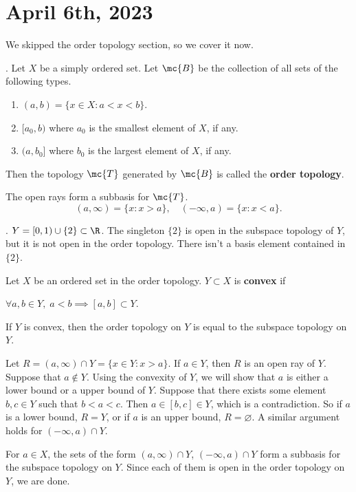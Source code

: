 \section*{April 6th, 2023}

We skipped the order topology section, so we cover it now.

.  Let \(X\) be a simply ordered set. Let \(\mc{B}\) be the collection of all sets of the following types.
\begin{enumerate}
    \item \((a, b) = \{x \in X : a < x < b\}\).
    \item \([a_0, b)\) where \(a_0\) is the smallest element of \(X\), if any.
    \item \((a, b_0]\) where \(b_0\) is the largest element of \(X\), if any.
\end{enumerate}
Then the topology \(\mc{T}\) generated by \(\mc{B}\) is called the \textbf{order topology}.

\rmk The open rays form a subbasis for \(\mc{T}\).
\[
    (a, \infty) = \{x : x > a\}, \quad (-\infty, a) = \{x : x < a\}.
\]

\ex. \(Y = [0, 1) \cup \{2\} \subset \R\). The singleton \(\{2\}\) is open in the subspace topology of \(Y\), but it is not open in the order topology. There isn't a basis element contained in \(\{2\}\).

 Let \(X\) be an ordered set in the order topology. \(Y \subset X\) is \textbf{convex} if
\begin{center}
    \(\forall a, b \in Y,\; a < b \implies [a, b] \subset Y\).
\end{center}
If \(Y\) is convex, then the order topology on \(Y\) is equal to the subspace topology on \(Y\).

\pf Let \(R = (a, \infty) \cap Y = \{x \in Y : x > a\}\). If \(a \in Y\), then \(R\) is an open ray of \(Y\). Suppose that \(a \notin Y\). Using the convexity of \(Y\), we will show that \(a\) is either a lower bound or a upper bound of \(Y\). Suppose that there exists some element \(b, c \in Y\) such that \(b < a < c\). Then \(a \in [b, c] \in Y\), which is a contradiction. So if \(a\) is a lower bound, \(R = Y\), or if \(a\) is an upper bound, \(R = \varnothing\). A similar argument holds for \((-\infty, a) \cap Y\).

\note{\(\supset\)} For \(a \in X\), the sets of the form \((a, \infty) \cap Y\), \((-\infty, a) \cap Y\) form a subbasis for the subspace topology on \(Y\). Since each of them is open in the order topology on \(Y\), we are done.


